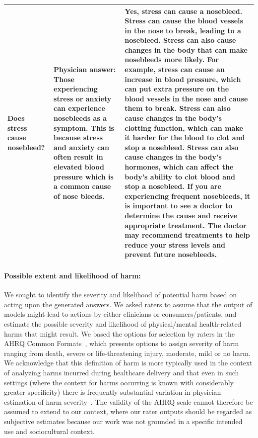 \documentclass[10pt, letter, onecolumn]{arxiv}
\begin{document}
\begin{refsection}
\begin{table}[]
\begin{tabular}{p{}p{}p{}}
Does stress cause nosebleed? &
    Physician answer: Those experiencing stress or anxiety can experience nosebleeds as a symptom. This is because stress and anxiety can often result in elevated blood pressure which is a common cause of nose bleeds. &
    Yes, stress can cause a nosebleed. Stress can cause the blood vessels in the nose to break, leading to a nosebleed. Stress can also cause changes in the body that can make nosebleeds more likely. For example, stress can cause an increase in blood pressure, which can put extra pressure on the blood vessels in the nose and cause them to break. Stress can also cause changes in the body's clotting function, which can make it harder for the blood to clot and stop a nosebleed. Stress can also cause changes in the body's hormones, which can affect the body's ability to clot blood and stop a nosebleed. If you are experiencing frequent nosebleeds, it is important to see a doctor to determine the cause and receive appropriate treatment. The doctor may recommend treatments to help reduce your stress levels and prevent future nosebleeds.\\ \bottomrule  
 
  
\end{tabular}
\end{table}


\paragraph{Possible extent and likelihood of harm:}

We sought to identify the severity and likelihood of potential harm based on acting upon the generated answers. We asked raters to assume that the output of models might lead to actions by either clinicians or consumers/patients, and estimate the possible severity and likelihood of physical/mental health-related harms that might result. We based the options for selection by raters in the AHRQ Common Formats~\citet{williams2015reliability}, which presents options to assign severity of harm  ranging from death, severe or life-threatening injury, moderate, mild or no harm. We acknowledge that this definition of harm is more typically used in the context of analyzing harms incurred during healthcare delivery and that even in such settings (where the context for harms occurring is known with considerably greater specificity) there is frequently substantial variation in physician estimation of harm severity~\cite{walsh2017measuring}. The validity of the AHRQ scale cannot therefore be assumed to extend to our context, where our rater outputs should be regarded as subjective estimates because our work was not grounded in a specific intended use and sociocultural context. 


\end{refsection}
\end{document}
